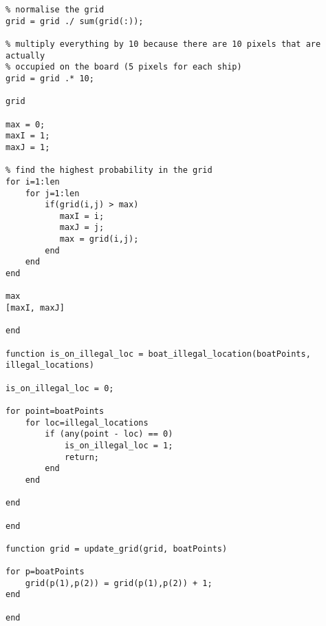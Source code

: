 \documentclass[11pt,a4paper,oneside]{report}
\begin{document}
\begin{lstlisting}
% normalise the grid
grid = grid ./ sum(grid(:));

% multiply everything by 10 because there are 10 pixels that are actually
% occupied on the board (5 pixels for each ship)
grid = grid .* 10;

grid

max = 0;
maxI = 1; 
maxJ = 1;

% find the highest probability in the grid
for i=1:len
    for j=1:len
        if(grid(i,j) > max)
           maxI = i;
           maxJ = j;
           max = grid(i,j); 
        end
    end
end

max
[maxI, maxJ]

end

function is_on_illegal_loc = boat_illegal_location(boatPoints, illegal_locations)

is_on_illegal_loc = 0;

for point=boatPoints
    for loc=illegal_locations
        if (any(point - loc) == 0)
            is_on_illegal_loc = 1;
            return;
        end
    end
    
end

end

function grid = update_grid(grid, boatPoints)

for p=boatPoints
    grid(p(1),p(2)) = grid(p(1),p(2)) + 1;
end

end
\end{lstlisting}
\end{document}
